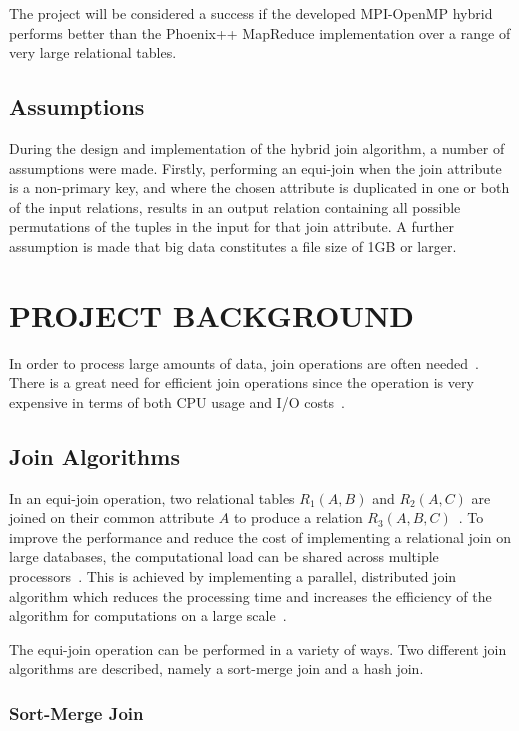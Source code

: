 \documentclass[12pt,twocolumn]{witseiepaper}
\begin{document}
The project will be considered a success if the developed MPI-OpenMP hybrid performs better than the Phoenix++ MapReduce implementation over a range of very large relational tables. 

\subsection{Assumptions}

During the design and implementation of the hybrid join algorithm, a number of assumptions were made. Firstly, performing an equi-join when the join attribute is a non-primary key, and where the chosen attribute is duplicated in one or both of the input relations, results in an output relation containing all possible permutations of the tuples in the input for that join attribute. A further assumption is made that big data constitutes a file size of 1GB or larger. 

\section{PROJECT BACKGROUND}
In order to process large amounts of data, join operations are often needed~\cite{mapReduceJoin}. There is a great need for efficient join operations since the operation is very expensive in terms of both CPU usage and I/O costs~\cite{mapReduceJoin}.

\subsection{Join Algorithms}

In an equi-join operation, two relational tables $R_1(A,B)$ and $R_2(A,C)$ are joined on their common attribute $A$ to produce a relation $R_3(A,B,C)$~\cite{thomas_zurek_optimisation_1997}. To improve the performance and reduce the cost of implementing a relational join on large databases, the computational load can be shared across multiple processors~\cite{thomas_zurek_optimisation_1997}. This is achieved by implementing a parallel, distributed join algorithm which reduces the processing time and increases the efficiency of the algorithm for computations on a large scale~\cite{thomas_zurek_optimisation_1997}.

The equi-join operation can be performed in a variety of ways. Two different join algorithms are described, namely a sort-merge join and a hash join.

\subsubsection{Sort-Merge Join}\label{sortmerge}$   $
\end{document}
